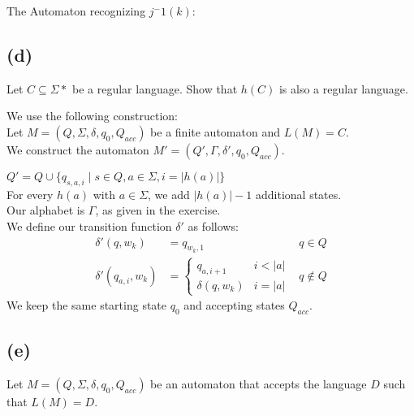 The Automaton recognizing $j^-1(k)$: \\


\subsection{(d)}

Let $C \subseteq \Sigma *$ be a regular language. Show that $h(C)$ is also a regular language.

We use the following construction:\\
Let $M=(Q,\Sigma,\delta,q_{0},Q_{acc})$ be a finite automaton and $L(M)=C$.\\
We construct the automaton $M'=(Q',\Gamma,\delta', q_{0}, Q_{acc})$.

$Q'=Q\cup \{ q_{s,a,i}\mid s\in Q, a \in \Sigma, i = \lvert h(a) \rvert \} $\\
For every $h(a)$ with $a \in \Sigma$, we add $\lvert h(a)\rvert -1$ additional states.\\
Our alphabet is $\Gamma$, as given in the exercise.\\
We define our transition function $\delta'$ as follows:\\
\begin{align*}
\delta' (q, w_{k}) &= q_{w_{k},1} &q\in Q\\
\delta' (q_{a,i}, w_{k}) &= 
\begin{cases}
    q_{a,i+1} &i < \lvert a \rvert\\
    \delta(q, w_{k})&i=\lvert a \rvert
\end{cases}
&q\notin Q
\end{align*}
We keep the same starting state $q_{0}$ and accepting states $Q_{acc}$.\\



\subsection{(e)}
Let \( M = (Q, \Sigma, \delta, q_0, Q_{acc}) \) be an automaton that accepts the language \( D \) such that \( L(M) = D \).

